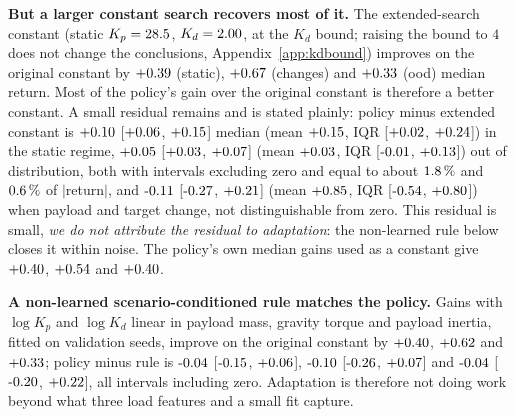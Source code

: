 \textbf{But a larger constant search recovers most of it.} The extended-search constant (static $K_p=28.5$, $K_d=2.00$, at the $K_d$ bound; raising the bound to $4$ does not change the conclusions, Appendix~\ref{app:kdbound}) improves on the original constant by $+0.39$ (static), $+0.67$ (changes) and $+0.33$ (ood) median return. Most of the policy's gain over the original constant is therefore a better constant. A small residual remains and is stated plainly: policy minus extended constant is $+0.10$ [$+0.06$, $+0.15$] median (mean $+0.15$, IQR [$+0.02$, $+0.24$]) in the static regime, $+0.05$ [$+0.03$, $+0.07$] (mean $+0.03$, IQR [$\SensVThreeOodPpoBestConstantExtQone$, $+0.13$]) out of distribution, both with intervals excluding zero and equal to about $1.8\,\%$ and $0.6\,\%$ of $|$return$|$, and $\SensVThreeChangesPpoBestConstantExtMed$ [$\SensVThreeChangesPpoBestConstantExtLo$, $+0.21$] (mean $+0.85$, IQR [$\SensVThreeChangesPpoBestConstantExtQone$, $+0.80$]) when payload and target change, not distinguishable from zero. This residual is small, \emph{we do not attribute the residual to adaptation}: the non-learned rule below closes it within noise. The policy's own median gains used as a constant give $+0.40$, $+0.54$ and $+0.40$.

\textbf{A non-learned scenario-conditioned rule matches the policy.} Gains with $\log K_p$ and $\log K_d$ linear in payload mass, gravity torque and payload inertia, fitted on validation seeds, improve on the original constant by $+0.40$, $+0.62$ and $+0.33$; policy minus rule is $\SensVThreeStaticPpoScenarioFitMed$ [$\SensVThreeStaticPpoScenarioFitLo$, $+0.06$], $\SensVThreeChangesPpoScenarioFitMed$ [$\SensVThreeChangesPpoScenarioFitLo$, $+0.07$] and $\SensVThreeOodPpoScenarioFitMed$ [$\SensVThreeOodPpoScenarioFitLo$, $+0.22$], all intervals including zero. Adaptation is therefore not doing work beyond what three load features and a small fit capture.

